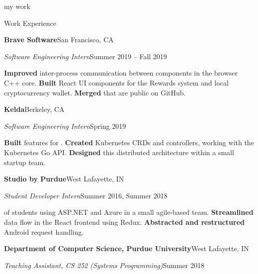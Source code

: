 \begin{minipage}[t]{0.665\textwidth}
  {\Huge my work \phantom{me}}

  \vspace{10pt}

  {\sectionfont Work Experience}

  \vspace{5pt}
  \textbf{Brave Software}\quad{}\hfill San Francisco, CA
  \begin{adjustwidth}{10pt}{}
    \emph{Software Engineering Intern}\hfill Summer 2019 -- Fall 2019

    \textbf{Improved} inter-process communication between components in the browser C++ core.
    \textbf{Built} React UI components for the Rewards system and local cryptocurrency wallet.
    \textbf{Merged}  that are public on GitHub.
  \end{adjustwidth}

  \vspace{5pt}
  \textbf{Kelda}\quad{}\hfill Berkeley, CA
  \begin{adjustwidth}{10pt}{}
    \emph{Software Engineering Intern}\hfill Spring 2019

    \textbf{Built} features for .
    \textbf{Created} Kubernetes CRDs and controllers, working with the Kubernetes Go API.
    \textbf{Designed} this distributed architecture within a small startup team.
  \end{adjustwidth}

  \vspace{5pt}
  \textbf{Studio by Purdue}\hfill West Lafayette, IN
  \begin{adjustwidth}{10pt}{}
    \emph{Student Developer Intern}\hfill Summer 2016, Summer 2018

     of students using ASP.NET and Azure in a small agile-based team.
    \textbf{Streamlined} data flow in the React frontend using Redux.
    \textbf{Abstracted and restructured} Android request handling.
  \end{adjustwidth}

  \vspace{5pt}
  \textbf{Department of Computer Science, Purdue University}\hfill West Lafayette, IN
  \begin{adjustwidth}{10pt}{}
    \emph{Teaching Assistant, CS 252 (Systems Programming)}\hfill Summer 2018


\end{adjustwidth}
\end{minipage}
